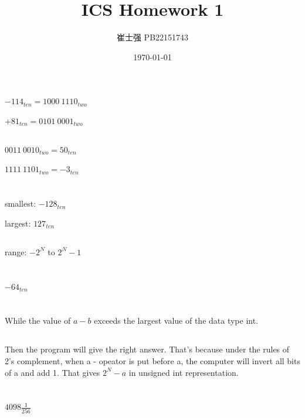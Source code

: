 \documentclass[UTF8]{ctexart}
\title{ICS Homework 1}
\author{崔士强 PB22151743}
\date{\today}
\begin{document}
\maketitle
\section{}
\subsection{}
$-114_{ten}=1000\ 1110_{two}$

$+81_{ten}=0101\ 0001_{two}$
\subsection{}
$0011\ 0010_{two}=50_{ten}$

$1111\ 1101_{two}=-3_{ten}$
\section{}
\subsection{}
smallest: $-128_{ten}$

largest: $127_{ten}$
\subsection{}
range: $-2^N$ to $2^N-1$
\section{}
$-64_{ten}$
\section{}
\subsection{}
While the value of $a-b$ exceeds the largest value of the data type int.
\subsection{}
Then the program will give the right answer. That's because under the rules of 2's complement, when a - opeator
is put before a, the computer will invert all bits of a and add 1. That gives $2^N-a$ in unsigned int representation.
\section{}
$4098\frac{1}{256}$
\end{document}
